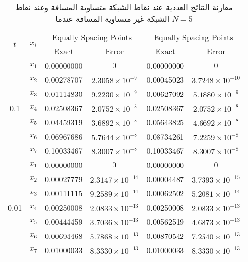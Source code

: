 	\begin{table}[ht]
		\renewcommand{\arraystretch}{1.5}
		\centering
		\begin{english}
\begin{tabular}{|c|c|c|c|c|c|}
			\hline
			\multirow{2}{*}{\( t \)} & \multirow{2}{*}{\( x_i \)} & \multicolumn{2}{c|}{Equally Spacing Points} & \multicolumn{2}{c|}{Equally Spacing Points} \\
			\cline{3-6}
			& & Exact & Error & Exact & Error \\
			\hline
			\multirow{7}{*}{0.1} & \( x_1 \) & 0.00000000 & \( 0 \) & 0.00000000 & \( 0 \) \\
			& \( x_2 \) & 0.00278707 & \( 2.3058 \times 10^{-9} \) & 0.00045023 & \( 3.7248 \times 10^{-10} \) \\
			& \( x_3 \) & 0.01114830 & \( 9.2230 \times 10^{-9} \) & 0.00627092 & \( 5.1880 \times 10^{-9} \) \\
			& \( x_4 \) & 0.02508367 & \( 2.0752 \times 10^{-8} \) & 0.02508367 & \( 2.0752 \times 10^{-8} \) \\
			& \( x_5 \) & 0.04459319 & \( 3.6892 \times 10^{-8} \) & 0.05643825 & \( 4.6692 \times 10^{-8} \) \\
			& \( x_6 \) & 0.06967686 & \( 5.7644 \times 10^{-8} \) & 0.08734261 & \( 7.2259 \times 10^{-8} \) \\
			& \( x_7 \) & 0.10033467 & \( 8.3007 \times 10^{-8} \) & 0.10033467 & \( 8.3007 \times 10^{-8} \) \\
			\hline
			\multirow{7}{*}{0.01} & \( x_1 \) & 0.00000000 & \( 0 \) & 0.00000000 & \( 0 \) \\
			& \( x_2 \) & 0.00027779 & \( 2.3147 \times 10^{-14} \) & 0.00004487 & \( 3.7393 \times 10^{-15} \) \\
			& \( x_3 \) & 0.00111115 & \( 9.2589 \times 10^{-14} \) & 0.00062502 & \( 5.2081 \times 10^{-14} \) \\
			& \( x_4 \) & 0.00250008 & \( 2.0833 \times 10^{-13} \) & 0.00250008 & \( 2.0833 \times 10^{-13} \) \\
			& \( x_5 \) & 0.00444459 & \( 3.7036 \times 10^{-13} \) & 0.00562519 & \( 4.6873 \times 10^{-13} \) \\
			& \( x_6 \) & 0.00694468 & \( 5.7868 \times 10^{-13} \) & 0.00870542 & \( 7.2540 \times 10^{-13} \) \\
			& \( x_7 \) & 0.01000033 & \( 8.3330 \times 10^{-13} \) & 0.01000033 & \( 8.3330 \times 10^{-13} \) \\
			\hline
		\end{tabular}
\end{english}
	\caption{\centering مقارنة النتائج العددية عند نقاط الشبكة متساوية المسافة وعند نقاط الشبكة غير متساوية المسافة عندما $N=5$}
\label{tab:firstN7}
\end{table}
	
